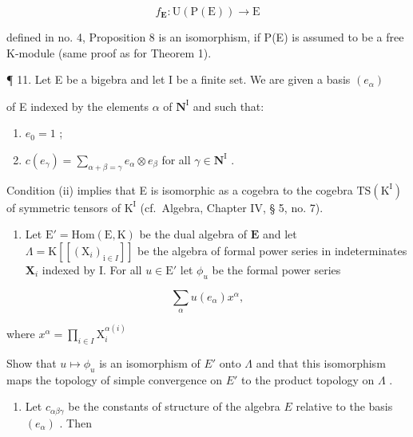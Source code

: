 \[
f _ {\mathbf {E}} \colon \mathrm{U} (\mathrm{P} (\mathrm{E})) \rightarrow \mathrm{E}
\]

defined in no. 4, Proposition 8 is an isomorphism, if P(E) is assumed to be a free K-module (same proof as for Theorem 1).

¶ 11. Let E be a bigebra and let I be a finite set. We are given a basis \((e_{\alpha})\)

of E indexed by the elements \(\alpha\) of \(\mathbf{N}^{\mathrm{I}}\) and such that:

\begin{enumerate}
\def\labelenumi{(\roman{enumi})}
\item
  \(e_{0} = 1\) ;
\item
  \(c(e_{\gamma}) = \sum_{\alpha + \beta = \gamma} e_{\alpha} \otimes e_{\beta}\) for all \(\gamma \in \mathbf{N}^{\mathrm{I}}\) .
\end{enumerate}

Condition (ii) implies that E is isomorphic as a cogebra to the cogebra \(\mathrm{TS}(\mathrm{K}^{\mathrm{I}})\) of symmetric tensors of \(\mathrm{K}^{\mathrm{I}}\) (cf.~Algebra, Chapter IV, § 5, no. 7).

\begin{enumerate}
\def\labelenumi{(\alph{enumi})}
\tightlist
\item
  Let \(\mathrm{E}' = \mathrm{Hom}(\mathrm{E},\mathrm{K})\) be the dual algebra of \(\mathbf{E}\) and let \(\Lambda = \mathrm{K}[[(\mathrm{X}_i)_{\mathrm{i}\in I}]]\) be the algebra of formal power series in indeterminates \(\mathbf{X}_i\) indexed by I. For all \(u\in \mathrm{E}'\) let \(\phi_u\) be the formal power series
\end{enumerate}

\[
\sum_ {\alpha} u (e _ {\alpha}) x ^ {\alpha},
\]

where \(x^{\alpha} = \prod_{i\in I}\mathrm{X}_{i}^{\alpha (i)}\)

Show that \(u \mapsto \phi_u\) is an isomorphism of \(E'\) onto \(\Lambda\) and that this isomorphism maps the topology of simple convergence on \(E'\) to the product topology on \(\Lambda\) .

\begin{enumerate}
\def\labelenumi{(\alph{enumi})}
\setcounter{enumi}{1}
\tightlist
\item
  Let \(c_{\alpha \beta \gamma}\) be the constants of structure of the algebra \(E\) relative to the basis \((e_{\alpha})\) . Then
\end{enumerate}

